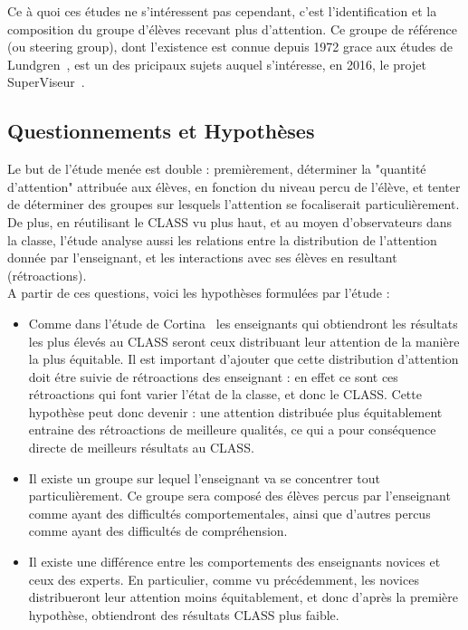 \documentclass{article}
\begin{document}
Ce à quoi ces études ne s'intéressent pas cependant, c'est l'identification et la composition du groupe d'élèves recevant plus d'attention. Ce groupe de référence (ou steering group), dont l'existence est connue depuis 1972 grace aux études de Lundgren~\cite{Lundgren}, est un des pricipaux sujets auquel s'intéresse, en 2016, le projet SuperViseur~\cite{SuperViseur}.

\subsection{Questionnements et Hypothèses}
Le but de l'étude menée est double : premièrement, déterminer la "quantité d'attention" attribuée aux élèves, en fonction du niveau percu de l'élève, et tenter de déterminer des groupes sur lesquels l'attention se focaliserait particulièrement. De plus, en réutilisant le CLASS vu plus haut, et au moyen d'observateurs dans la classe, l'étude analyse aussi les relations entre la distribution de l'attention donnée par l'enseignant, et les interactions avec ses élèves en resultant (rétroactions).\\
A partir de ces questions, voici les hypothèses formulées par l'étude :
\begin{itemize}
  \item Comme dans l'étude de Cortina~\cite{Cortina} les enseignants qui obtiendront les résultats les plus élevés au CLASS seront ceux distribuant leur attention de la manière la plus équitable. Il est important d'ajouter que cette distribution d'attention doit étre suivie de rétroactions des enseignant : en effet ce sont ces rétroactions qui font varier l'état de la classe, et donc le CLASS. Cette hypothèse peut donc devenir : une attention distribuée plus équitablement entraine des rétroactions de meilleure qualités, ce qui a pour conséquence directe de meilleurs résultats au CLASS.
  \item Il existe un groupe sur lequel l'enseignant va se concentrer tout particulièrement. Ce groupe sera composé des élèves percus par l'enseignant comme ayant des difficultés comportementales, ainsi que d'autres percus comme ayant des difficultés de compréhension.
  \item Il existe une différence entre les comportements des enseignants novices et ceux des experts. En particulier, comme vu précédemment, les novices distribueront leur attention moins équitablement, et donc d'après la première hypothèse, obtiendront des résultats CLASS plus faible.
\end{itemize}
\end{document}

